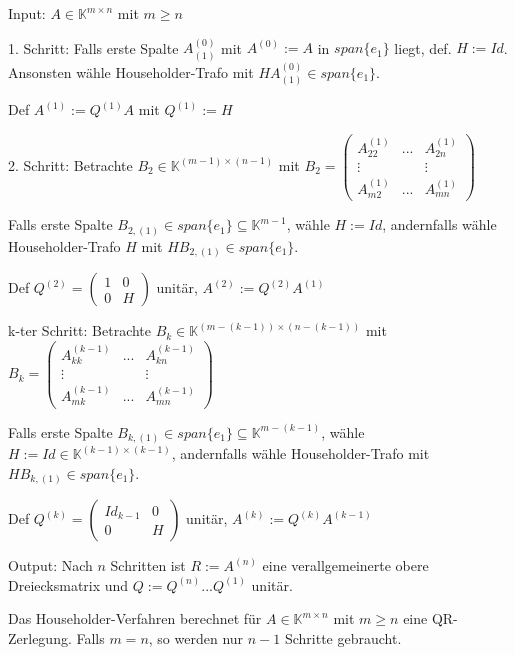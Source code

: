 \begin{algorithm}
	Input: $A \in \mathbb{K}^{m\times n}$ mit $m \geq n$
	
	1. Schritt: Falls erste Spalte $A_{(1)}^{(0)}$ mit $A^{(0)} := A$ in $span\{e_1\}$ liegt, def. $H:=Id$. Ansonsten wähle Householder-Trafo mit $HA_{(1)}^{(0)} \in span\{e_1\}$.
	
	Def $A^{(1)} := Q^{(1)} A$ mit $Q^{(1)} := H$
	
	2. Schritt: Betrachte $B_2 \in \mathbb{K}^{(m-1)\times (n-1)}$ mit $B_2 = \left(\begin{matrix}
		A_{22}^{(1)} & ... & A_{2n}^{(1)}\\
		\vdots & & \vdots\\
		A_{m2}^{(1)} & ... & A_{mn}^{(1)}
	\end{matrix}\right)$
	
	Falls erste Spalte $B_{2,(1)} \in span\{e_1\} \subseteq \mathbb{K}^{m-1}$, wähle $H:=Id$, andernfalls wähle Householder-Trafo $H$ mit $HB_{2,(1)} \in span\{e_1\}$.
	
	Def $Q^{(2)} = \left(\begin{matrix}
		1 & 0\\
		0 & H
	\end{matrix}\right)$ unitär, $A^{(2)} := Q^{(2)}A^{(1)}$
	
	k-ter Schritt: Betrachte $B_k \in \mathbb{K}^{(m-(k-1))\times (n-(k-1))}$ mit $B_k = \left(\begin{matrix}
		A_{kk}^{(k-1)} & ... & A_{kn}^{(k-1)}\\
		\vdots & & \vdots\\
		A_{mk}^{(k-1)} & ... & A_{mn}^{(k-1)}
	\end{matrix}\right)$
	
	Falls erste Spalte $B_{k,(1)} \in span\{e_1\} \subseteq \mathbb{K}^{m-(k-1)}$, wähle $H:=Id \in \mathbb{K}^{(k-1)\times (k-1)}$, andernfalls wähle Householder-Trafo mit $HB_{k,(1)} \in span\{e_1\}$.
	
	Def $Q^{(k)} = \left(\begin{matrix}
		Id_{k-1} & 0\\
		0 & H
	\end{matrix}\right)$ unitär, $A^{(k)} := Q^{(k)}A^{(k-1)}$
	
	Output: Nach $n$ Schritten ist $R:=A^{(n)}$ eine verallgemeinerte obere Dreiecksmatrix und $Q:=Q^{(n)}...Q^{(1)}$ unitär.
\end{algorithm}

\begin{theorem}
	Das Householder-Verfahren berechnet für $A \in \mathbb{K}^{m\times n}$ mit $m \geq n$ eine QR-Zerlegung. Falls $m = n$, so werden nur $n-1$ Schritte gebraucht.
\end{theorem}

